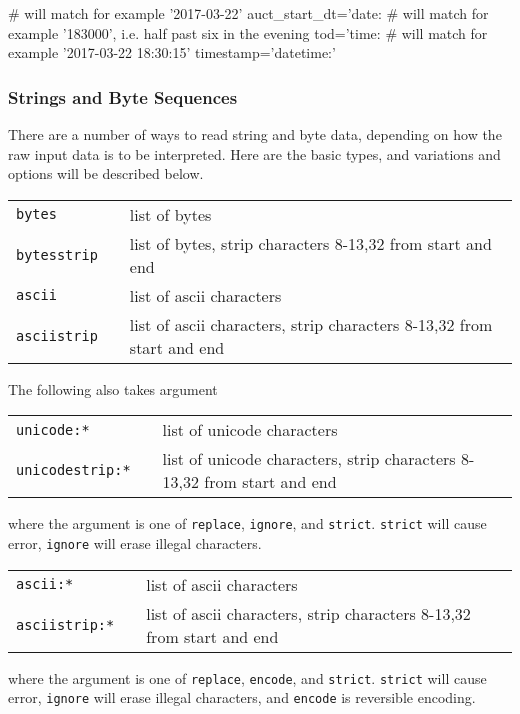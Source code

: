 \begin{python}
   # will match for example '2017-03-22'
   auct_start_dt='date:%
   # will match for example '183000', i.e. half past six in the evening
   tod='time:%
   # will match for example '2017-03-22 18:30:15'
   timestamp='datetime:'%
\end{python}


\subsubsection{Strings and Byte Sequences}
There are a number of ways to read string and byte data, depending on
how the raw input data is to be interpreted.  Here are the basic
types, and variations and options will be described below.
\begin{leftbar}
\begin{tabular}{p{2cm}p{2cm}p{8cm}}
  \texttt{bytes}      && list of bytes\\
  \texttt{bytesstrip} && list of bytes, strip characters 8-13,32 from start and end\\
  \texttt{ascii}      && list of ascii characters\\
  \texttt{asciistrip} && list of ascii characters, strip characters 8-13,32 from start and end\\
\end{tabular}
\end{leftbar}
\noindent The following also takes argument
\begin{leftbar}
\begin{tabular}{p{2cm}p{2cm}p{8cm}}
  \texttt{unicode:*}  && list of unicode characters\\
  \texttt{unicodestrip:*} && list of unicode characters, strip
  characters 8-13,32 from start and end\\
\end{tabular}
\end{leftbar}
\noindent where the argument is one of \texttt{replace}, \texttt{ignore}, and
\texttt{strict}.  \texttt{strict} will cause error, \texttt{ignore}
will erase illegal characters.
\begin{leftbar}
\begin{tabular}{p{2cm}p{2cm}p{8cm}}
  \texttt{ascii:*}      && list of ascii characters\\
  \texttt{asciistrip:*} && list of ascii characters, strip characters 8-13,32 from start and end\\
\end{tabular}
\end{leftbar}
\noindent where the argument is one of \texttt{replace}, \texttt{encode}, and \texttt{strict}.
\texttt{strict} will cause error, \texttt{ignore} will erase illegal characters,
and \texttt{encode} is reversible encoding.





